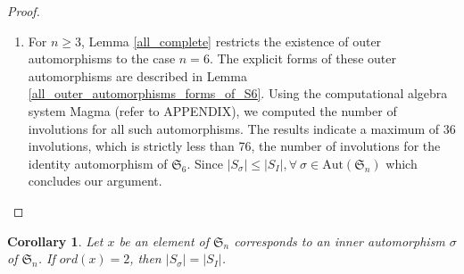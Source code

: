 \documentclass[oneside]{amsart}
\theoremstyle{plain}
\newtheorem{corollary}[theorem]{Corollary}%
\theoremstyle{definition}
\theoremstyle{remark}
\newcommand{\ord}{ord}
\begin{document}
\begin{proof}
\begin{enumerate}
\begin{itemize}
                \begin{align*}
                    \alpha(y_1) = \alpha(y_2) \implies x^{\frac{\ord(x)}{2}}y_1 = x^{\frac{\ord(x)}{2}}y_2 \implies y_1 = y_2
                \end{align*}
                Hence $\alpha$ is one-one. Now, we claim that $\alpha(y)$ is order 1 order 2 element. Let $y \in \mathfrak{S}_n$.
                \begin{align*}
                    (x^{\frac{\ord(x)}{2}}y) \cdot (x^{\frac{\ord(x)}{2}}y) &= (x^{\frac{\ord(x)}{2}}y) \cdot e \cdot (x^{\frac{\ord(x)}{2}}y)\\
                    &=  (x^{\frac{\ord(x)}{2}}y) \cdot x^{-\frac{\ord(x)}{2}} \cdot x^{-\frac{\ord(x)}{2}} \cdot (x^{\frac{\ord(x)}{2}}y)\\
                    \implies &= (x^{\frac{\ord(x)}{2}} \cdot y \cdot x^{-\frac{\ord(x)}{2}} \cdot y)\  (\because \frac{\ord(x)}{2} \text{ is odd})\\
                    \implies &= y^{-1}\cdot y\\
                    \implies &= e
                \end{align*}
                We have $\ord(\alpha(y)) = 2 \text{ or } 1$, whenever $\ord(x) \geq 3$ and $\ord(x)/2$ is odd.
            \end{itemize}
            \item For $n \geq 3$, Lemma \ref{all_complete} restricts the existence of outer automorphisms to the case $n=6$. The explicit forms of these outer automorphisms are described in Lemma \ref{all_outer_automorphisms_forms_of_S6}. Using the computational algebra system Magma \cite{MR1484478} (refer to APPENDIX), we computed the number of involutions for all such automorphisms. The results indicate a maximum of 36 involutions, which is strictly less than 76, the number of involutions for the identity automorphism of $\mathfrak{S}_6$.
        Since $|S_{\sigma}| \leq |S_I|, \forall \ \sigma \in \text{Aut}(\mathfrak{S}_n)$ which concludes our argument.
        \end{enumerate}
    \end{proof}

    \begin{corollary}
        Let $x$ be an element of $\mathfrak{S}_n$ corresponds to an inner automorphism $\sigma$ of $\mathfrak{S}_n$. If $\ord(x) = 2$, then $|S_{\sigma}| = |S_I|$.
    \end{corollary}
    
\end{document}

